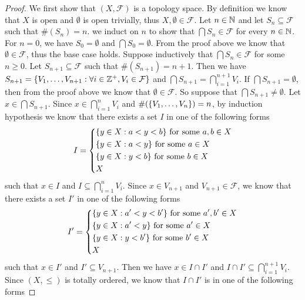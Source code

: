 \begin{proof}
  We first show that \((X, \mathcal{F})\) is a topology space.
  By definition we know that \(X\) is open and \(\emptyset\) is open trivially, thus \(X, \emptyset \in \mathcal{F}\).
  Let \(n \in \mathbb{N}\) and let \(S_n \subseteq \mathcal{F}\) such that \(\#(S_n) = n\).
  we induct on \(n\) to show that \(\bigcap S_n \in \mathcal{F}\) for every \(n \in \mathbb{N}\).
  For \(n = 0\), we have \(S_0 = \emptyset\) and \(\bigcap S_0 = \emptyset\).
  From the proof above we know that \(\emptyset \in \mathcal{F}\), thus the base case holds.
  Suppose inductively that \(\bigcap S_n \in \mathcal{F}\) for some \(n \geq 0\).
  Let \(S_{n + 1} \subseteq \mathcal{F}\) such that \(\#(S_{n + 1}) = n + 1\).
  Then we have \(S_{n + 1} = \left\lbrace V_1, \dots, V_{n + 1} : \forall i \in \mathbb{Z}^+, V_i \in \mathcal{F}\right\rbrace\) and \(\bigcap S_{n + 1} = \bigcap_{i = 1}^{n + 1} V_i\).
  If \(\bigcap S_{n + 1} = \emptyset\), then from the proof above we know that \(\emptyset \in \mathcal{F}\).
  So suppose that \(\bigcap S_{n + 1} \neq \emptyset\).
  Let \(x \in \bigcap S_{n + 1}\).
  Since \(x \in \bigcap_{i = 1}^n V_i\) and \(\#(\left\lbrace V_1, \dots, V_n\right\rbrace) = n\), by induction hypothesis we know that there exists a set \(I\) in one of the following forms
  \[
    I = \begin{dcases}
      \set{y \in X : a < y < b} \text{ for some } a, b \in X \\
      \set{y \in X : a < y} \text{ for some } a \in X        \\
      \set{y \in X : y < b} \text{ for some } b \in X        \\
      X
    \end{dcases}
  \]
  such that \(x \in I\) and \(I \subseteq \bigcap_{i = 1}^n V_i\).
  Since \(x \in V_{n + 1}\) and \(V_{n + 1} \in \mathcal{F}\), we know that there exists a set \(I'\) in one of the following forms
  \[
    I' = \begin{dcases}
      \set{y \in X : a' < y < b'} \text{ for some } a', b' \in X \\
      \set{y \in X : a' < y} \text{ for some } a' \in X          \\
      \set{y \in X : y < b'} \text{ for some } b' \in X          \\
      X
    \end{dcases}
  \]
  such that \(x \in I'\) and \(I' \subseteq V_{n + 1}\).
  Then we have \(x \in I \cap I'\) and \(I \cap I' \subseteq \bigcap_{i = 1}^{n + 1} V_i\).
  Since \((X, \leq)\) is totally ordered, we know that \(I \cap I'\) is in one of the following forms

\end{proof}
